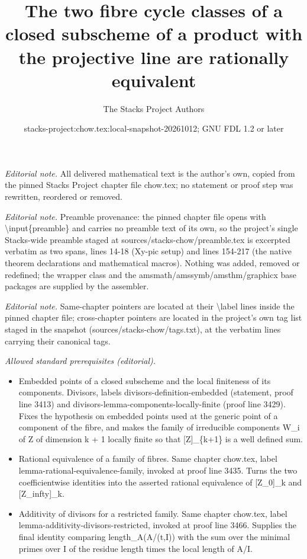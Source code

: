 \documentclass[10pt,a4paper]{amsart}
\title{The two fibre cycle classes of a closed subscheme of a product with the projective line are rationally equivalent}
\author{The Stacks Project Authors}
\date{stacks-project:chow.tex:local-snapshot-20261012; GNU FDL 1.2 or later}
\theoremstyle{plain}
\theoremstyle{definition}
\theoremstyle{remark}
\numberwithin{equation}{subsection}
\begin{document}
\maketitle
\noindent\textit{Editorial note.} All delivered mathematical text is the author's own, copied from the pinned Stacks Project chapter file chow.tex; no statement or proof step was rewritten, reordered or removed.\par\medskip
\noindent\textit{Editorial note.} Preamble provenance: the pinned chapter file opens with \textbackslash{}input\{preamble\} and carries no preamble text of its own, so the project's single Stacks-wide preamble staged at sources/stacks-chow/preamble.tex is excerpted verbatim as two spans, lines 14-18 (Xy-pic setup) and lines 154-217 (the native theorem declarations and mathematical macros). Nothing was added, removed or redefined; the wrapper class and the amsmath/amssymb/amsthm/graphicx base packages are supplied by the assembler.\par\medskip
\noindent\textit{Editorial note.} Same-chapter pointers are located at their \textbackslash{}label lines inside the pinned chapter file; cross-chapter pointers are located in the project's own tag list staged in the snapshot (sources/stacks-chow/tags.txt), at the verbatim lines carrying their canonical tags.\par\medskip
\noindent\textit{Allowed standard prerequisites (editorial).}\begin{itemize}
\item Embedded points of a closed subscheme and the local finiteness of its components. Divisors, labels divisors-definition-embedded (statement, proof line 3413) and divisors-lemma-components-locally-finite (proof line 3429). Fixes the hypothesis on embedded points used at the generic point of a component of the fibre, and makes the family of irreducible components W\_i of Z of dimension k + 1 locally finite so that [Z]\_\{k+1\} is a well defined sum.
\item Rational equivalence of a family of fibres. Same chapter chow.tex, label lemma-rational-equivalence-family, invoked at proof line 3435. Turns the two coefficientwise identities into the asserted rational equivalence of [Z\_0]\_k and [Z\_infty]\_k.
\item Additivity of divisors for a restricted family. Same chapter chow.tex, label lemma-additivity-divisors-restricted, invoked at proof line 3466. Supplies the final identity comparing length\_A(A/(t,I)) with the sum over the minimal primes over I of the residue length times the local length of A/I.
\end{itemize}\medskip
\end{document}
